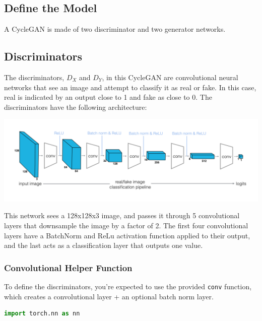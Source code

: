 \subsection{Define the Model}

A CycleGAN is made of two discriminator and two generator networks.

\subsection{Discriminators}

The discriminators, \(D_X\) and \(D_Y\), in this CycleGAN are
convolutional neural networks that see an image and attempt to classify
it as real or fake. In this case, real is indicated by an output close
to 1 and fake as close to 0. The discriminators have the following
architecture:

\includegraphics[width=1\linewidth]{img//genAdvNet//image2image/discriminator_layers.png}

This network sees a 128x128x3 image, and passes it through 5
convolutional layers that downsample the image by a factor of 2. The
first four convolutional layers have a BatchNorm and ReLu activation
function applied to their output, and the last acts as a classification
layer that outputs one value.

\subsubsection{Convolutional Helper Function}

To define the discriminators, you're expected to use the provided
\lstinline{conv} function, which creates a convolutional
layer + an optional batch norm layer.

\begin{lstlisting}[language=Python]
import torch.nn as nn
\end{lstlisting}

